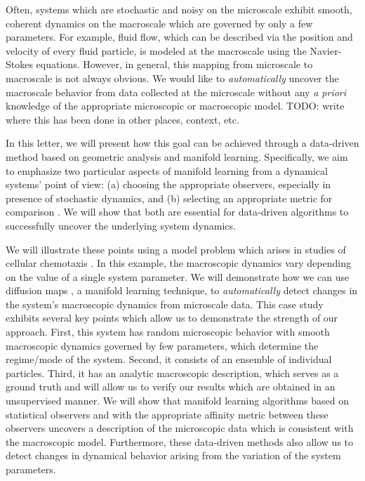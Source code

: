 \documentclass[prl, reprint, final, showkeys]{revtex4-1}
\begin{document}
Often, systems which are stochastic and noisy on the microscale exhibit smooth, coherent dynamics on the macroscale which are governed by only a few parameters.
%
For example, fluid flow, which can be described via the position and velocity of every fluid particle, is modeled at the macroscale using the Navier-Stokes equations.
%
However, in general, this mapping from microscale to macroscale is not always obvious.
%
We would like to {\em automatically} uncover the macroscale behavior from data collected at the microscale without any {\em a priori} knowledge of the appropriate microscopic or macroscopic model.
%
TODO: write where this has been done in other places, context, etc.

In this letter, we will present how this goal can be achieved through a data-driven method based on geometric analysis and manifold learning. 
%
Specifically, we aim to emphasize two particular aspects of manifold learning from a dynamical systems' point of view: (a) choosing the appropriate observers, especially in presence of stochastic dynamics, and (b) selecting an appropriate metric for comparison \cite{mallat2012group}. 
%
We will show that both are essential for data-driven algorithms to successfully uncover the underlying system dynamics. 

We will illustrate these points using a model problem which arises in studies of cellular chemotaxis \cite{othmer2000diffusion}.
%
In this example, the macroscopic dynamics vary depending on the value of a single system parameter.
%
We will demonstrate how we can use diffusion maps \cite{coifman2005geometric}, a manifold learning technique, to {\em automatically} detect changes in the system's macroscopic dynamics from microscale data.
%
This case study exhibits several key points which allow us to demonstrate the strength of our approach.
%
First, this system has random microscopic behavior with smooth macroscopic dynamics governed by few parameters, which determine the regime/mode of the system. 
%
Second, it consists of an ensemble of individual particles.
%
Third, it has an analytic macroscopic description, which serves as a ground truth and will allow us to verify our results which are obtained in an unsupervised manner.
%
We will show that manifold learning algorithms based on statistical observers and with the appropriate affinity metric between these observers uncovers a description of the microscopic data which is consistent with the macroscopic model.
%
Furthermore, these data-driven methods also allow us to detect changes in dynamical behavior arising from the variation of the system parameters. 
\end{document}
